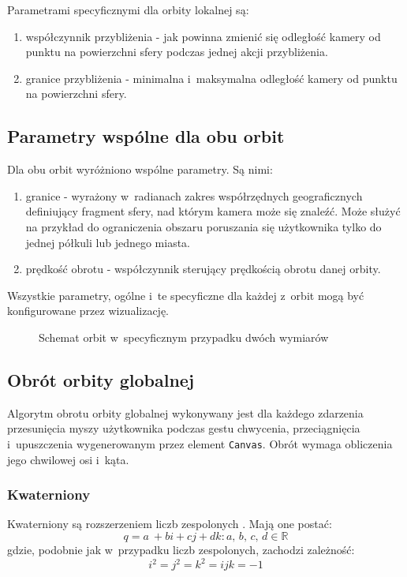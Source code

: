Parametrami specyficznymi dla orbity lokalnej są:
\begin{enumerate}
    \item współczynnik przybliżenia - jak powinna zmienić się odległość kamery od punktu na powierzchni sfery podczas jednej akcji przybliżenia.
    \item granice przybliżenia - minimalna i~maksymalna odległość kamery od punktu na powierzchni sfery.
\end{enumerate}

\subsection{Parametry wspólne dla obu orbit}

Dla obu orbit wyróżniono wspólne parametry. Są nimi:
\begin{enumerate}
    \item granice - wyrażony w~radianach zakres współrzędnych geograficznych definiujący fragment sfery, nad którym kamera może się znaleźć. Może służyć na przykład do ograniczenia obszaru poruszania się użytkownika tylko do jednej półkuli lub jednego miasta.
    \item prędkość obrotu - współczynnik sterujący prędkością obrotu danej orbity.
\end{enumerate}

Wszystkie parametry, ogólne i~te specyficzne dla każdej z~orbit mogą być konfigurowane przez wizualizację.

\begin{figure}[]
    \centering
    
    \caption{Schemat orbit w~specyficznym przypadku dwóch wymiarów}
    \label{fig:orbits}
\end{figure}



\subsection{Obrót orbity globalnej}

Algorytm obrotu orbity globalnej wykonywany jest dla każdego zdarzenia przesunięcia myszy użytkownika podczas gestu chwycenia, przeciągnięcia i~upuszczenia wygenerowanym przez element \texttt{Canvas}. Obrót wymaga obliczenia jego chwilowej osi i~kąta.

\subsubsection{Kwaterniony}
Kwaterniony są rozszerzeniem liczb zespolonych \cite{Quaternions}. Mają one postać:
\begin{equation}
    \label{eq:q_1}
    q = a~+ bi + cj + dk : a,\,b,\,c,\,d\in\mathbb{R}
\end{equation}
gdzie, podobnie jak w~przypadku liczb zespolonych, zachodzi zależność:
\begin{equation}
    \label{eq:q_2}
    i^2 = j^2 = k^2 = ijk =  -1
\end{equation}


